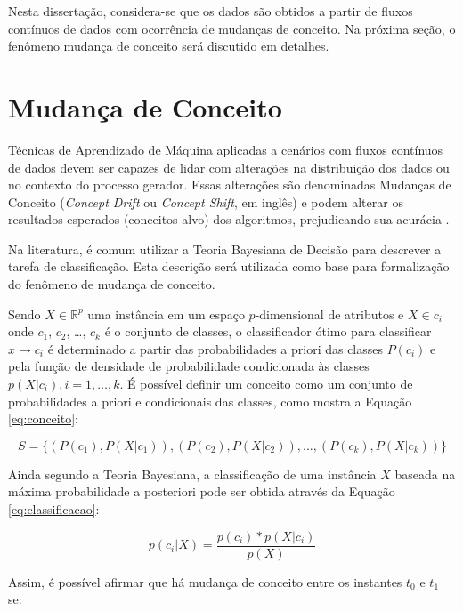\documentclass[msc, classic, a4paper]{ufbathesis}
\begin{document}
Nesta dissertação, considera-se que os dados são obtidos a partir de fluxos contínuos de dados com ocorrência de mudanças de conceito.
Na próxima seção, o fenômeno mudança de conceito será discutido em detalhes.

\section{Mudança de Conceito}
\label{sec:mudanca_de_conceito}

Técnicas de Aprendizado de Máquina aplicadas a cenários com fluxos contínuos de dados devem ser capazes de lidar com alterações na distribuição dos dados ou no contexto do processo gerador.
Essas alterações são denominadas Mudanças de Conceito (\textit{Concept Drift} ou \textit{Concept Shift}, em inglês) e podem alterar os resultados esperados (conceitos-alvo) dos algoritmos, prejudicando sua acurácia \cite{Widmer:1996:LPC:226791.226798}.

Na literatura, é comum utilizar a Teoria Bayesiana de Decisão \cite{Duda:2000:PC:954544} para descrever a tarefa de classificação.
Esta descrição será utilizada como base para formalização do fenômeno de mudança de conceito.

Sendo $X \in \mathbb{R}^p$ uma instância em um espaço $p$-dimensional de atributos e $X \in c_i$ onde $c_1$, $c_2$, \ldots, $c_k$ é o conjunto de classes,
o classificador ótimo para classificar $x \rightarrow c_i$ é determinado a partir das probabilidades a priori das classes $P(c_i)$ e pela função de densidade de probabilidade condicionada às classes $p(X|c_i), i = 1, \ldots, k$.
É possível definir um conceito como um conjunto de probabilidades a priori e condicionais das classes, como mostra a Equação \ref{eq:conceito}:

\begin{equation} \label{eq:conceito}
    S = \{(P(c_1), P(X|c_1)), (P(c_2), P(X|c_2)), ..., (P(c_k), P(X|c_k))\}
\end{equation}

Ainda segundo a Teoria Bayesiana, a classificação de uma instância $X$ baseada na máxima probabilidade a posteriori pode ser obtida através da Equação \ref{eq:classificacao}:

\begin{equation} \label{eq:classificacao}
    p(c_i|X) = \frac{p(c_i) * p(X|c_i)}{p(X)}
\end{equation}

Assim, é possível afirmar que há mudança de conceito entre os instantes $t_0$ e $t_1$ se:
\end{document}

